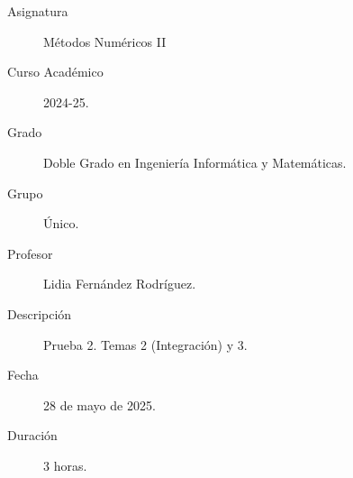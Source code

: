 \documentclass[12pt]{article}
\begin{document}

    
    

    \begin{description}
        \item[Asignatura] Métodos Numéricos II
        \item[Curso Académico] 2024-25.
        \item[Grado] Doble Grado en Ingeniería Informática y Matemáticas.
        \item[Grupo] Único.
        \item[Profesor] Lidia Fernández Rodríguez.
        \item[Descripción] Prueba 2. Temas 2 (Integración) y 3.
        \item[Fecha] 28 de mayo de 2025.
        \item[Duración] 3 horas.
    
    \end{description}
    \newpage
\end{document}
